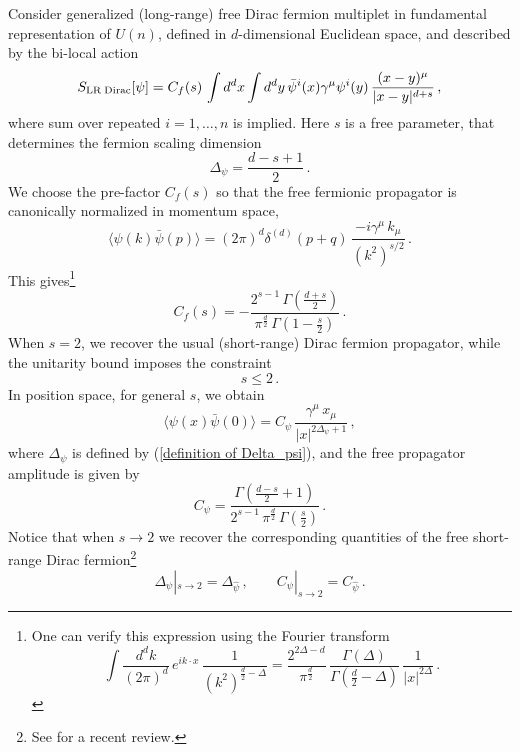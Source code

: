 \documentclass[aps,amsmath,amssymb,prd,showpacs,floatfix,preprint,superscriptaddress,nofootinbib,12pt]{article}
\begin{document}
Consider generalized (long-range) free Dirac fermion multiplet in fundamental
representation of $U(n)$, defined in $d$-dimensional Euclidean space, and
described by the bi-local action
\begin{equation}
\label{free generalized psi action}
S_{\textrm{LR\;Dirac}}[\psi] =C_f(s)\, \int d^dx\int d^dy\,\bar\psi^i(x)\gamma^\mu\psi^i(y)
\,\frac{(x-y)^\mu}{|x-y|^{d+s}}\,,
\end{equation}
where sum over repeated $i=1,\dots,n$ is implied.
Here $s$ is a free parameter, that determines the fermion scaling dimension
\begin{equation}
\label{definition of Delta_psi}
\Delta_\psi = \frac{d-s+1}{2}\,.
\end{equation}
We choose the pre-factor $C_f(s)$ so that the free fermionic propagator is canonically
normalized in momentum space,
\begin{equation}
\langle \psi(k)\bar\psi(p)\rangle = (2\pi)^d \delta^{(d)}(p+q)\,\frac{-i\gamma^\mu\, k_\mu}{(k^2)^{s/2}}\,.
\end{equation}
This gives\footnote{One can verify this expression using the Fourier transform
\begin{equation}
\int \frac{d^dk}{(2\pi)^d}\,e^{ik\cdot x}\,\frac{1}{(k^2)^{\frac{d}{2}-\Delta}}
=\frac{2^{2\Delta-d}}{\pi^\frac{d}{2}}\,\frac{\Gamma(\Delta)}
{\Gamma\left(\frac{d}{2}-\Delta\right)}\,\frac{1}{|x|^{2\Delta}}\,.
\end{equation}}
\begin{equation}
\label{Cf(s)}
C_f(s) = - \frac{2^{s-1}\,\Gamma\left(\frac{d+s}{2}\right)}{\pi^\frac{d}{2}\,
\Gamma\left(1-\frac{s}{2}\right)}\,.
\end{equation}
When $s=2$, we recover the usual (short-range) Dirac fermion propagator,
while the unitarity bound imposes the constraint
\begin{equation}
\label{unitarity for LR fermion}
s\leq 2\,.
\end{equation}
In position space, for general $s$, we obtain
\begin{equation}
\label{free gen fermion prop}
\langle \psi(x)\bar\psi(0)\rangle = C_\psi\,\frac{\gamma^\mu\, x_\mu}{|x|^{2\Delta_\psi+1}}\,,
\end{equation}
where $\Delta_\psi$ is defined by (\ref{definition of Delta_psi}), and the free propagator
amplitude is given by
\begin{equation}
\label{definition of C_psi}
C_\psi = \frac{\Gamma\left(\frac{d-s}{2}+1\right)}{2^{s-1}\,\pi^\frac{d}{2}\,\Gamma\left(\frac{s}{2}\right)}\,.
\end{equation}
Notice that when $s\rightarrow 2$ we recover the corresponding quantities
of the free short-range Dirac fermion\footnote{See \cite{Goykhman:2020ffn} for a recent review.}
\begin{equation}
\Delta_\psi|_{s\rightarrow 2} = \Delta_{\hat\psi}\,,\qquad
C_\psi|_{s\rightarrow 2} = C_{\hat\psi}\,.
\end{equation}
\end{document}
